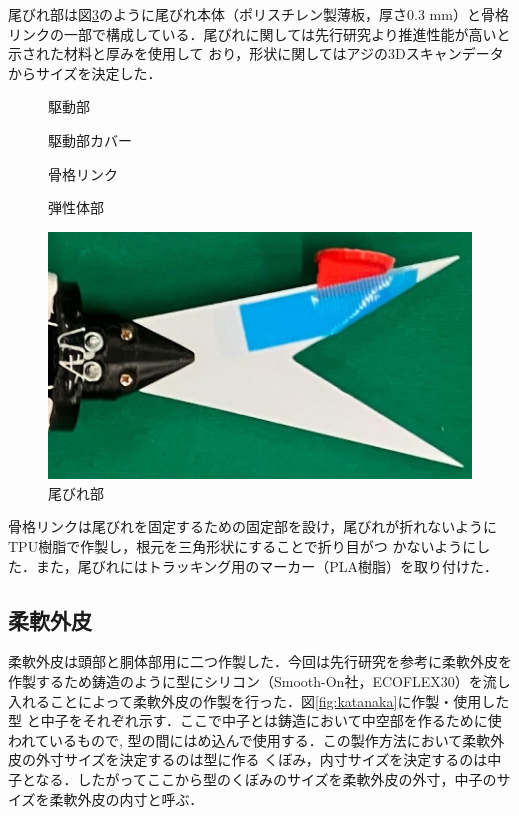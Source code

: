 尾びれ部は図\ref{fig:obire}のように尾びれ本体（ポリスチレン製薄板，厚さ0.3 mm）と骨格リンクの一部で構成している．尾びれに関しては先行研究\cite{ni}より推進性能が高いと示された材料と厚みを使用して
おり，形状に関してはアジの3Dスキャンデータからサイズを決定した．
\begin{figure}[hb]
    \centering
    \begin{minipage}[b]{0.32\linewidth}
        \centering
        \caption{駆動部}
        \label{fig:kudou}
    \end{minipage}
    \hspace{0.1\linewidth}
    \begin{minipage}[b]{0.3\linewidth}
        \centering
        \caption{駆動部カバー}
        \label{fig:cover}
    \end{minipage}
\end{figure}
\begin{figure}[hb]
    \centering
    \begin{minipage}[b]{0.30\linewidth}
        \centering
        \caption{骨格リンク}
        \label{fig:link2}
    \end{minipage}
    \hspace{0.1\linewidth}
    \begin{minipage}[b]{0.33\linewidth}
        \centering
        \caption{弾性体部}
        \label{fig:real_link}
    \end{minipage}
\end{figure}
\begin{figure}[t]
    \centering
    \includegraphics[width=0.5\linewidth]{chapters/picture/obire.jpg}
    \caption{尾びれ部}
    \label{fig:obire}
\end{figure}
骨格リンクは尾びれを固定するための固定部を設け，尾びれが折れないようにTPU樹脂で作製し，根元を三角形状にすることで折り目がつ
かないようにした．また，尾びれにはトラッキング用のマーカー（PLA樹脂）を取り付けた．

\subsection{柔軟外皮}
柔軟外皮は頭部と胴体部用に二つ作製した．今回は先行研究\cite{kyu}を参考に柔軟外皮を作製するため鋳造のように型にシリコン（Smooth-On社，ECOFLEX30）を流し入れることによって柔軟外皮の作製を行った．図\ref{fig:katanaka}に作製・使用した型
と中子をそれぞれ示す．ここで中子とは鋳造において中空部を作るために使われているもので, 型の間にはめ込んで使用する．この製作方法において柔軟外皮の外寸サイズを決定するのは型に作る
くぼみ，内寸サイズを決定するのは中子となる．したがってここから型のくぼみのサイズを柔軟外皮の外寸，中子のサイズを柔軟外皮の内寸と呼ぶ．


